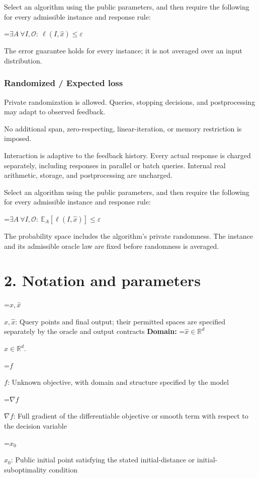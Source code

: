 \documentclass[10pt,a4paper]{article}
\newcommand{\AtlasMath}[1]{\par\begingroup\centering\setbox0=\hbox{$\displaystyle #1$}\ifdim\wd0>1.4\linewidth\typeout{ATLAS WIDE FORMULA: \the\wd0}\fi\ifdim\wd0>\linewidth\resizebox{\linewidth}{!}{\box0}\else\box0\fi\par\endgroup}
\newcommand{\AtlasInlineMath}[1]{\begingroup\setbox0=\hbox{$#1$}\ifdim\wd0>.4\linewidth\endgroup\AtlasMath{#1}\else\endgroup$#1$\fi}
\begin{document}
Select an algorithm using the public parameters, and then require the following for every admissible instance and response rule:


\AtlasMath{\exists A\ \forall I,\mathcal{O}:\ \ell(I,\widehat{x})\le\varepsilon}


The error guarantee holds for every instance; it is not averaged over an input distribution.

\subsubsection{Randomized / Expected loss}
Private randomization is allowed. Queries, stopping decisions, and postprocessing may adapt to observed feedback.

No additional span, zero-respecting, linear-iteration, or memory restriction is imposed.

Interaction is adaptive to the feedback history. Every actual response is charged separately, including responses in parallel or batch queries. Internal real arithmetic, storage, and postprocessing are uncharged.

Select an algorithm using the public parameters, and then require the following for every admissible instance and response rule:


\AtlasMath{\exists A\ \forall I,\mathcal{O}:\ \mathbb{E}_A[\ell(I,\widehat{x})]\le\varepsilon}


The probability space includes the algorithm's private randomness. The instance and its admissible oracle law are fixed before randomness is averaged.

\section{2. Notation and parameters}
\AtlasInlineMath{x,\widehat{x}}: Query points and final output; their permitted spaces are specified separately by the oracle and output contracts \textbf{Domain:} \AtlasInlineMath{\widehat{x}\in \mathbb{R}^d}.

\AtlasInlineMath{f}: Unknown objective, with domain and structure specified by the model

\AtlasInlineMath{\nabla f}: Full gradient of the differentiable objective or smooth term with respect to the decision variable

\AtlasInlineMath{x_0}: Public initial point satisfying the stated initial-distance or initial-suboptimality condition
\end{document}
